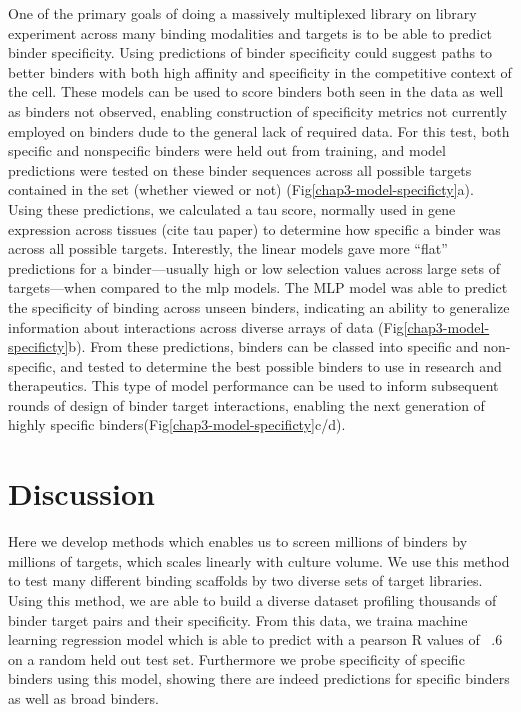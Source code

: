One of the primary goals of doing a massively multiplexed library on library experiment across many binding modalities and targets is to be able to predict binder specificity. Using predictions of binder specificity could suggest paths to better binders with both high affinity and specificity in the competitive context of the cell.  These models can be used to score binders both seen in the data as well as binders not observed, enabling construction of specificity metrics not currently employed on binders dude to the general lack of required data. For this test, both specific and nonspecific binders were held out from training, and model predictions were tested on these binder sequences across all possible targets contained in the set (whether viewed or not) (Fig\ref{chap3-model-specificty}a). Using these predictions, we calculated a tau score, normally used in gene expression across tissues (cite tau paper) to determine how specific a binder was across all possible targets. Interestly, the linear models gave more “flat” predictions for a binder---usually high or low selection values across large sets of targets---when compared to the mlp models. The MLP model was able to predict the specificity of binding across unseen binders, indicating an ability to generalize information about interactions across diverse arrays of data (Fig\ref{chap3-model-specificty}b). From these predictions, binders can be classed into specific and non-specific, and tested to determine the best possible binders to use in research and therapeutics. This type of model performance can be used to inform subsequent rounds of design of binder target interactions, enabling the next generation of highly specific binders(Fig\ref{chap3-model-specificty}c/d). 

\section{Discussion}

Here we develop methods which enables us to screen millions of binders by millions of targets, which scales linearly with culture volume. We use this method to test many different binding scaffolds by two diverse sets of target libraries. Using this method, we are able to build a diverse dataset profiling thousands of binder target pairs and their specificity. From this data, we traina machine learning regression model which is able to predict with a pearson R values of ~.6 on a random held out test set. Furthermore we probe specificity of specific binders using this model, showing there are indeed predictions for specific binders as well as broad binders. 

